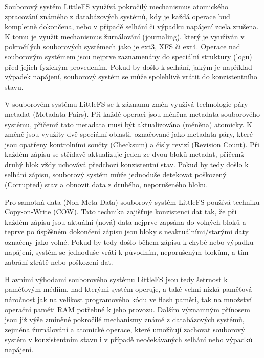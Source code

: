 
Souborový systém LittleFS využívá pokročilý mechanismus atomického zpracování známého z databázových systémů, kdy je každá operace buď kompletně dokončena, nebo v případě selhání či výpadku napájení zcela zrušena. K tomu je využit mechanismus žurnálování (journaling), který je využíván v pokročilých souborových systémech jako je ext3, XFS či ext4. Operace nad souborovým systémem jsou nejprve zaznamenány do speciální struktury (logu) před jejich fyzickým provedením. Pokud by došlo k selhání, jakým je například výpadek napájení, souborový systém se může spolehlivě vrátit do konzistentního stavu.

V souborovém systému LittleFS se k záznamu změn využívá technologie páry metadat (Metadata Pairs). Při každé operaci jsou měněna metadata souborového systému, přičemž tato metadata musí být aktualizována (měněna) atomicky. K změně jsou využity dvě speciální oblasti, označované jako metadata páry, které jsou opatřeny kontrolními součty (Checksum) a čísly revizí (Revision Count). Při každém zápisu se střídavě aktualizuje jeden ze dvou bloků metadat, přičemž druhý blok vždy uchovává předchozí konzistentní stav. Pokud by tedy došlo k selhání zápisu, souborový systém může jednoduše detekovat poškozený (Corrupted) stav a obnovit data z druhého, neporušeného bloku. \cite{nxp_the_design_of_the_little_filesystem}

Pro samotná data (Non-Meta Data) souborový systém LittleFS používá techniku Copy-on-Write (COW). Tato technika zajišťuje konzistenci dat tak, že při každém zápisu jsou aktuální (nová) data nejprve zapsána do volných bloků a teprve po úspěšném dokončení zápisu jsou bloky s neaktuálními/starými daty označeny jako volné. Pokud by tedy došlo během zápisu k chybě nebo výpadku napájení, systém se jednoduše vrátí k původním, neporušeným blokům, a tím zabrání ztrátě nebo poškození dat. \cite{nxp_the_design_of_the_little_filesystem}

Hlavními výhodami souborového systému LittleFS jsou tedy šetrnost k paměťovým médiím, nad kterými systém operuje, a také velmi nízká paměťová náročnost jak na velikost programového kódu ve flash paměti, tak na množství operační paměti RAM potřebné k jeho provozu. Dalším významným přínosem jsou již výše zmíněné pokročilé mechanismy známé z databázových systémů, zejména žurnálování a atomické operace, které umožňují zachovat souborový systém v konzistentním stavu i v případě neočekávaných selhání nebo výpadků napájení. \cite{nxp_the_design_of_the_little_filesystem}


